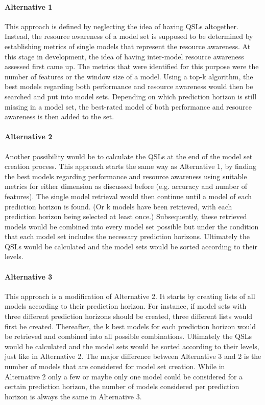 \paragraph*{Alternative 1}
This approach is defined by neglecting the idea of having QSLs altogether. Instead, the resource awareness of a model set is supposed to be determined by establishing metrics of single models that represent the resource awareness. At this stage in development, the idea of having inter-model resource awareness assessed first came up. The metrics that were identified for this purpose were the number of features or the window size of a model. Using a top-k algorithm, the best models regarding both performance and resource awareness would then be searched and put into model sets. Depending on which prediction horizon is still missing in a model set, the best-rated model of both performance and resource awareness is then added to the set. 

\paragraph{Alternative 2}
Another possibility would be to calculate the QSLs at the end of the model set creation process. This approach starts the same way as Alternative 1, by finding the best models regarding performance and resource awareness using suitable metrics for either dimension as discussed before (e.g. accuracy and number of features). The single model retrieval would then continue until a model of each prediction horizon is found. (Or k models have been retrieved, with each prediction horizon being selected at least once.) Subsequently, these retrieved models would be combined into every model set possible but under the condition that each model set includes the necessary prediction horizons. Ultimately the QSLs would be calculated and the model sets would be sorted according to their levels.

\paragraph{Alternative 3}
This approach is a modification of Alternative 2. It starts by creating lists of all models according to their prediction horizon. For instance, if model sets with three different prediction horizons should be created, three different lists would first be created. Thereafter, the k best models for each prediction horizon would be retrieved and combined into all possible combinations. Ultimately the QSLs would be calculated and the model sets would be sorted according to their levels, just like in Alternative 2. The major difference between Alternative 3 and 2 is the number of models that are considered for model set creation. While in Alternative 2 only a few or maybe only one model could be considered for a certain prediction horizon, the number of models considered per prediction horizon is always the same in Alternative 3. 

